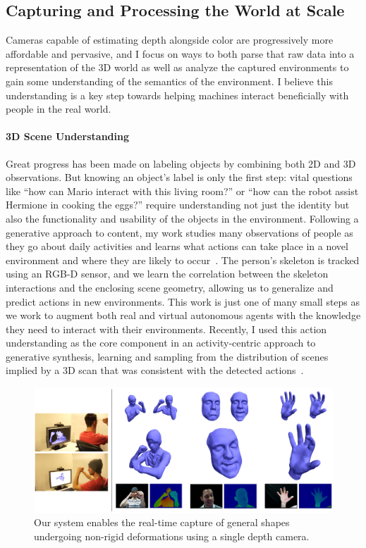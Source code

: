 \documentclass[12pt, a4paper]{article}
\begin{document}
\begin{small}
\subsection*{Capturing and Processing the World at Scale}

Cameras capable of estimating depth alongside color are progressively more affordable and pervasive, and I focus on ways to both parse that raw data into a representation of the 3D world as well as analyze the captured environments to gain some understanding of the semantics of the environment. I believe this understanding is a key step towards helping machines interact beneficially with people in the real world. 

\paragraph{3D Scene Understanding} Great progress has been made on labeling objects by combining both 2D and 3D observations. But knowing an object's label is only the first step: vital questions like ``how can Mario interact with this living room?'' or ``how can the robot assist Hermione in cooking the eggs?'' require understanding not just the identity but also the functionality and usability of the objects in the environment. Following a generative approach to content, my work studies many observations of people as they go about daily activities and learns what actions can take place in a novel environment and where they are likely to occur~\cite{scenegrok}. The person's skeleton is tracked using an RGB-D sensor, and we learn the correlation between the skeleton interactions and the enclosing scene geometry, allowing us to generalize and predict actions in new environments. This work is just one of many small steps as we work to augment both real and virtual autonomous agents with the knowledge they need to interact with their environments. Recently, I used this action understanding as the core component in an activity-centric approach to generative synthesis, learning and sampling from the distribution of scenes implied by a 3D scan that was consistent with the detected actions~\cite{actsynth}.

\begin{figure}[h]
  \centering
    \includegraphics[width=\textwidth]{deformablesTeaser.png}
  \caption{Our system enables the real-time capture of general shapes undergoing non-rigid deformations using a single depth camera.}
  \label{fig:deformables}  
\end{figure}


\end{small}
\end{document}
